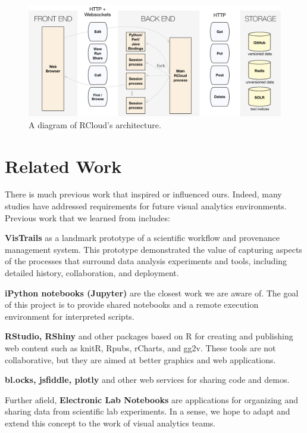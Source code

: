 \begin{figure}
  \centering
\includegraphics[width=.75\linewidth]{fig/system/system.pdf}
\caption{\label{fig:system}A diagram of RCloud's architecture. }
\end{figure}

\section{Related Work}

There is much previous work that inspired or influenced ours.
Indeed, many studies have addressed requirements for future visual
analytics environments.
Previous work that we learned from includes:

{\bf VisTrails} as a landmark prototype of a scientific workflow
and provenance management system. This prototype demonstrated
the value of capturing aspects of the processes that
surround data analysis experiments and tools, including detailed
history, collaboration, and deployment.

{\bf iPython notebooks (Jupyter)} are the closest work we are aware of.
The goal of this project is to provide shared notebooks and a remote
execution environment for interpreted scripts. 

{\bf RStudio, RShiny} and other packages based on R for creating and
publishing web content such as knitR, Rpubs, rCharts, and gg2v.
These tools are not collaborative, but they are aimed at better
graphics and web applications.

{\bf bl.ocks, jsfiddle, plotly} and other web services for sharing code
and demos.

Further afield, {\bf Electronic Lab Notebooks} are applications for organizing
and sharing data from scientific lab experiments\cite{Rubacha:2011:ELN}.
In a sense, we hope to adapt and extend this concept to the work of
visual analytics teams.

